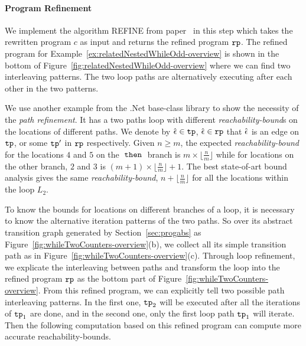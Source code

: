 \paragraph{Program Refinement}
We implement the algorithm REFINE from paper~\cite{GulwaniJK09} in this step which takes the rewritten program $c$ as input and returns the
refined program $\mathtt{rp}$.
The refined program for Example~\ref{ex:relatedNestedWhileOdd-overview} is shown in the bottom of Figure~\ref{fig:relatedNestedWhileOdd-overview} where we can find two interleaving patterns.
The two loop paths are alternatively executing after each other in the two patterns.
\begin{example}
\label{ex:twoCounterWhile}
 We use another example from the .Net base-class library to show the necessity of the \emph{path refinement}. It has a two paths loop
 with different \emph{reachability-bound}s on the locations of different paths.
 We denote by $\hat{\mathtt{\epsilon}{}} \in \mathtt{tp}$, $\hat{\mathtt{\epsilon}{}} \in\mathtt{rp}$ that $\hat{\mathtt{\epsilon}{}}$ is an edge on $\mathtt{tp}$, or some $\mathtt{tp}'$ in $\mathtt{rp}$ respectively.
Given $n \geq m$,
the expected \emph{reachability-bound} for the locations $4$ and $5$ on the $\mathtt{\;then\;}$ branch is $m \times \lfloor\frac{n}{m}\rfloor$
while for locations on the other branch, $2$ and $3$ is $(m + 1) \times \lfloor\frac{n}{m}\rfloor + 1$. 
The best state-of-art bound analysis
gives the same \emph{reachability-bound}, $n + \lfloor\frac{n}{m}\rfloor$ for all the locations within the loop $L_2$.

To know the bounds for locations on different branches of a loop, 
it is necessary to know the alternative iteration patterns of the two paths.
So over its abstract transition graph generated by Section~\ref{sec:progabs} as Figure~\ref{fig:whileTwoCounters-overview}(b), we collect all its simple transition path as in Figure~\ref{fig:whileTwoCounters-overview}(c).
Through loop refinement, we explicate the interleaving between paths and
transform the loop into the refined program $\mathtt{rp}$ as the bottom part of Figure~\ref{fig:whileTwoCounters-overview}.
From this refined program, we can explicitly tell two possible path interleaving patterns.
In the first one, $\mathtt{tp}_2$ will be executed after all the iterations of $\mathtt{tp}_1$ are done, and in the second one,
only the first loop path $\mathtt{tp}_1$ will iterate.
Then the following computation based on this refined program can compute more accurate reachability-bounds.
\end{example}

